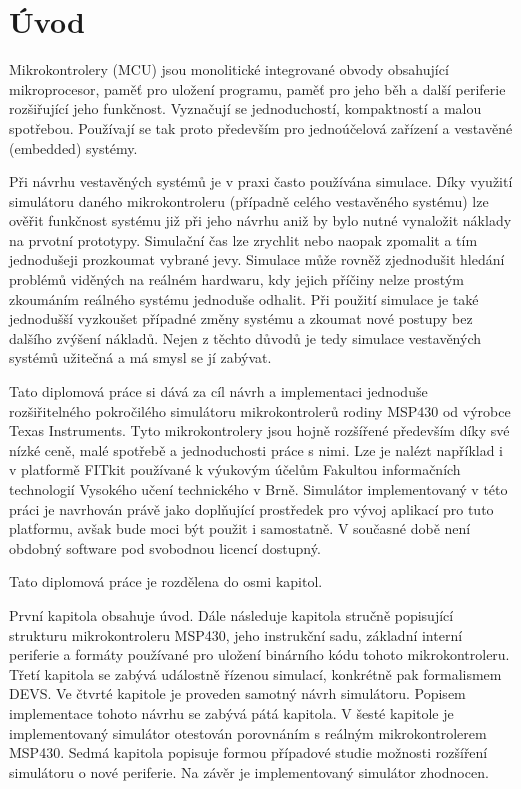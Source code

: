\chapter{Úvod}

Mikrokontrolery (MCU) jsou monolitické integrované obvody obsahující mikroprocesor, paměť pro uložení programu, paměť pro jeho běh a další periferie
rozšiřující jeho funkčnost. Vyznačují se jednoduchostí, kompaktností a malou spotřebou. Používají se tak proto především pro jednoúčelová zařízení a 
vestavěné (embedded) systémy.

Při návrhu vestavěných systémů je v praxi často používána simulace. Díky využití simulátoru daného mikrokontroleru (případně celého vestavěného systému) lze ověřit funkčnost systému již při jeho návrhu aniž by bylo nutné vynaložit náklady na prvotní prototypy. Simulační čas lze zrychlit nebo naopak zpomalit a tím jednodušeji prozkoumat vybrané jevy. Simulace může rovněž zjednodušit hledání problémů viděných na reálném hardwaru, kdy jejich příčiny nelze prostým zkoumáním reálného systému jednoduše odhalit. Při použití simulace je také jednodušší vyzkoušet případné změny systému a zkoumat nové postupy bez dalšího zvýšení nákladů. Nejen z těchto důvodů je tedy simulace vestavěných systémů užitečná a má smysl se jí zabývat.

Tato diplomová práce si dává za cíl návrh a implementaci jednoduše rozšiřitelného pokročilého simulátoru mikrokontrolerů rodiny MSP430 od výrobce Texas Instruments. Tyto mikrokontrolery jsou hojně rozšířené především díky své nízké ceně, malé spotřebě a jednoduchosti práce s nimi. Lze je nalézt například i v platformě FITkit \cite{fitkit} používané k výukovým účelům Fakultou informačních technologií Vysokého učení technického v Brně. Simulátor implementovaný v této práci je navrhován právě jako doplňující prostředek pro vývoj aplikací pro tuto platformu, avšak bude moci být použit i samostatně. V současné době není obdobný software pod svobodnou licencí dostupný.

Tato diplomová práce je rozdělena do osmi kapitol.

První kapitola obsahuje úvod. Dále následuje kapitola stručně popisující strukturu mikrokontroleru MSP430, jeho instrukční sadu, základní interní periferie a formáty používané pro uložení binárního kódu tohoto mikrokontroleru. Třetí kapitola se zabývá událostně řízenou simulací, konkrétně pak formalismem DEVS. Ve čtvrté kapitole je proveden samotný návrh simulátoru. Popisem implementace tohoto návrhu se zabývá pátá kapitola. V šesté kapitole je implementovaný simulátor otestován porovnáním s reálným mikrokontrolerem MSP430. Sedmá kapitola popisuje formou případové studie možnosti rozšíření simulátoru o nové periferie. Na závěr je implementovaný simulátor zhodnocen.

